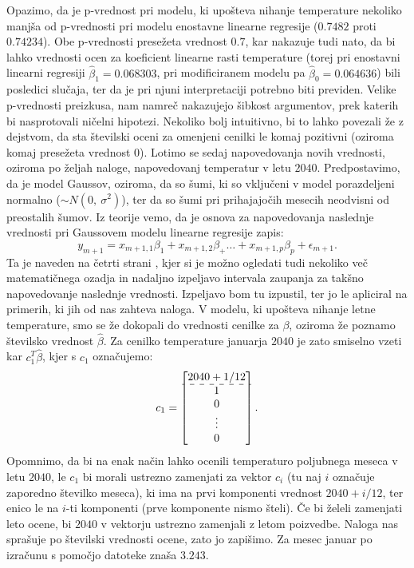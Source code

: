\documentclass{article}
\begin{document}
Opazimo, da je p-vrednost pri modelu, ki upošteva nihanje temperature nekoliko manjša od p-vrednosti pri modelu enostavne linearne regresije ($0.7482$ proti $0.74234$). 
Obe p-vrednosti presežeta vrednost $0.7$, kar nakazuje tudi nato, da bi lahko vrednosti ocen za koeficient linearne rasti temperature (torej pri enostavni linearni regresiji $\hat{\beta}_1 = 0.068303$, pri modificiranem modelu pa $\hat{\beta}_0 = 0.064636$) bili posledici slučaja, ter da je pri njuni interpretaciji potrebno biti previden.
Velike p-vrednosti preizkusa, nam namreč nakazujejo šibkost argumentov, prek katerih bi nasprotovali ničelni hipotezi. 
Nekoliko bolj intuitivno, bi to lahko povezali že z dejstvom, da sta številski oceni za omenjeni cenilki le komaj pozitivni (oziroma komaj presežeta vrednost $0$).
\newline
\newline
Lotimo se sedaj napovedovanja novih vrednosti, oziroma po željah naloge, napovedovanj temperatur v letu $2040$. Predpostavimo, da je model Gaussov, oziroma, da so šumi, ki so vključeni v model porazdeljeni normalno ($\sim N(0,~\sigma^2)$), ter da so šumi pri prihajajočih mesecih neodvisni od preostalih šumov. 
\newline
Iz teorije vemo, da je osnova za napovedovanja naslednje vrednosti pri Gaussovem modelu linearne regresije zapis:
$$
y_{m+1} = x_{m+1,1}\beta_1 + x_{m+1,2}\beta_ + \dots + x_{m+1,p}\beta_p + \epsilon_{m+1}.
$$
Ta je naveden na četrti strani \cite{lin_reg}, kjer si je možno ogledati tudi nekoliko več matematičnega ozadja in nadaljno izpeljavo intervala zaupanja za takšno napovedovanje naslednje vrednosti. 
Izpeljavo bom tu izpustil, ter jo le apliciral na primerih, ki jih od nas zahteva naloga.
\newline
V modelu, ki upošteva nihanje letne temperature, smo se že dokopali do vrednosti cenilke za $\beta$, oziroma že poznamo številsko vrednost $\hat{\beta}$. 
Za cenilko temperature januarja $2040$ je zato smiselno vzeti kar $c_1^T \hat{\beta}$, kjer s $c_1$ označujemo:
$$
    c_1= \begin{bmatrix}
        2040 + 1/12 \\
        \hdashline
        1\\
        0\\
        \vdots\\
        0
    \end{bmatrix}.
$$
Opomnimo, da bi na enak način lahko ocenili temperaturo poljubnega meseca v letu $2040$, le $c_1$ bi morali ustrezno zamenjati za vektor $c_i$ (tu naj $i$ označuje zaporedno številko meseca), ki ima na prvi komponenti vrednost $2040 + i/12$, ter enico le na $i$-ti komponenti (prve komponente nismo šteli).
Če bi želeli zamenjati leto ocene, bi $2040$ v vektorju ustrezno zamenjali z letom poizvedbe. 
Naloga nas sprašuje po številski vrednosti ocene, zato jo zapišimo.
Za mesec januar po izračunu s pomočjo datoteke znaša $3.243$.
\end{document}
